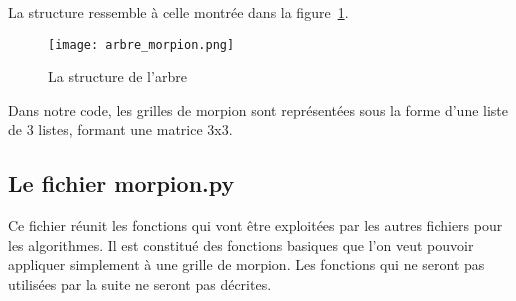 \documentclass{article}
\begin{document}
La structure ressemble à celle montrée dans la figure~\ref{tree}.

\begin{figure}[!h]
\centering
\texttt{[image: arbre\_morpion.png]}
\caption{La structure de l'arbre}
\label{tree}
\end{figure}

Dans notre code, les grilles de morpion sont représentées sous la forme d'une liste de 3 listes, formant une matrice 3x3.

\subsection{Le fichier morpion.py}

Ce fichier réunit les fonctions qui vont être exploitées par les autres fichiers pour les algorithmes. Il est constitué des fonctions basiques que l'on veut pouvoir appliquer simplement à une grille de morpion. Les fonctions qui ne seront pas utilisées par la suite ne seront pas décrites.
\end{document}
